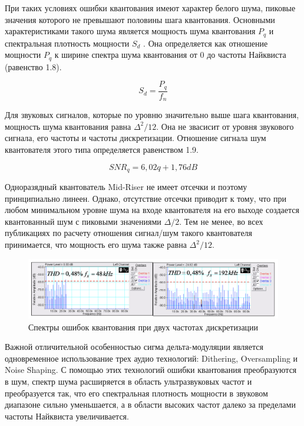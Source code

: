 \documentclass[12pt,a4paper,oneside]{report}
\begin{document}
При таких условиях ошибки квантования имеют характер белого шума, пиковые значения которого не превышают половины шага квантования. Основными характеристиками такого шума является мощность шума квантования $P_q$ и спектральная плотность мощности $S_d$ . Она определяется как отношение мощности $P_q$ к ширине спектра шума квантования от 0 до частоты Найквиста (равенство 1.8).

\begin{equation}
	S_d = \frac{P_q}{f_n}
\end{equation}

Для  звуковых сигналов, которые по уровню значительно выше шага квантования, мощность шума квантования равна $\Delta^2/12$. Она не звасисит от уровня звукового сигнала, его частоты и частоты дискретизации. Отношение сигнала шум квантователя этого типа определяется равенством 1.9.

\begin{equation}
	SNR_q = 6,02q + 1,76dB
\end{equation}

Одноразядный квантователь Mid-Riser не имеет отсечки и поэтому принципиально линеен. Однако, отсутствие отсечки приводит к тому, что при любом минимальном уровне шума на входе квантователя на его выходе создается квантованный шум с пиковыми значениями $\Delta/2$. Тем не менее, во всех публикациях по расчету отношения сигнал/шум такого квантователя принимается, что мощность его шума также равна $\Delta^2 /12$.

\begin{figure}[!htbp]
	\centering
	\includegraphics[scale=0.5]{mistakes2.png}
	\caption{Спектры ошибок квантования при двух частотах дискретизации}
	\label{ris:mistakes2}
\end{figure}

Важной отличительной особенностью сигма дельта-модуляции является одновременное использование трех аудио технологий: Dithering, Oversampling и Noise Shaping\cite{fifty}. С помощью этих технологий ошибки квантования преобразуются в шум, спектр шума расширяется в область ультразвуковых частот и преобразуется так, что его спектральная плотность мощности в звуковом диапазоне сильно уменьшается, а в области высоких частот далеко за пределами частоты Найквиста увеличивается.
\end{document}
